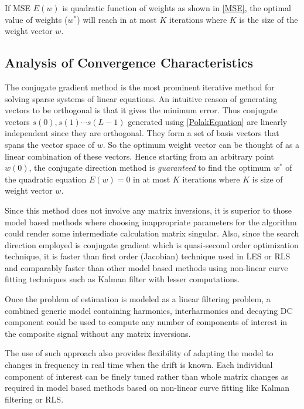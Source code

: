\documentclass{UCF_ETD}
\begin{document}
If MSE $E(w)$ is quadratic function of weights as shown in \eqref{MSE}, the optimal value of weights ($w^*$) will reach in at most $K$ iterations where $K$ is the size of the weight vector $w$.

\subsection{Analysis of Convergence Characteristics}
The conjugate gradient method is the most prominent iterative method for solving sparse systems of linear equations. An intuitive reason of generating vectors to be orthogonal is that it gives the minimum error. Thus conjugate vectors $s(0),s(1) \cdots s(L-1)$ generated using \eqref{PolakEquation} are linearly independent since they are orthogonal. They form a set of basis vectors that spans the  vector space of $w$. So the optimum weight vector can be thought of as a linear combination of these vectors. Hence starting from an arbitrary point $w(0)$, the conjugate direction method is \emph{guaranteed}  to find the optimum $w^*$ of the quadratic equation $E(w)=0$  in at most $K$ iterations where $K$ is size of weight vector $w$.

Since this method does not involve any matrix inversions, it is superior to those model based methods where choosing inappropriate parameters for the algorithm could render some intermediate calculation matrix singular. Also, since the search direction employed is conjugate gradient which is quasi-second order optimization technique, it is faster than first order (Jacobian) technique used in LES or RLS and comparably faster than other model based methods using non-linear curve fitting techniques such as Kalman filter with lesser computations. 

Once the problem of estimation is modeled as a linear filtering problem, a combined generic model containing harmonics, interharmonics and decaying DC component could be used to compute any number of components of interest in the composite signal without any matrix inversions. 

The use of such approach also provides flexibility of adapting the model to changes in frequency in real time when the drift is known. Each individual component of interest can be finely tuned rather than whole matrix changes as required in model based methods based on non-linear curve fitting like Kalman filtering or RLS. 
\end{document}

